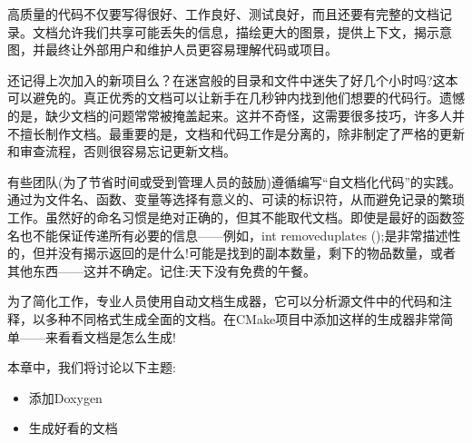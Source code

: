 高质量的代码不仅要写得很好、工作良好、测试良好，而且还要有完整的文档记录。文档允许我们共享可能丢失的信息，描绘更大的图景，提供上下文，揭示意图，并最终让外部用户和维护人员更容易理解代码或项目。

还记得上次加入的新项目么？在迷宫般的目录和文件中迷失了好几个小时吗?这本可以避免的。真正优秀的文档可以让新手在几秒钟内找到他们想要的代码行。遗憾的是，缺少文档的问题常常被掩盖起来。这并不奇怪，这需要很多技巧，许多人并不擅长制作文档。最重要的是，文档和代码工作是分离的，除非制定了严格的更新和审查流程，否则很容易忘记更新文档。

有些团队(为了节省时间或受到管理人员的鼓励)遵循编写“自文档化代码”的实践。通过为文件名、函数、变量等选择有意义的、可读的标识符，从而避免记录的繁琐工作。虽然好的命名习惯是绝对正确的，但其不能取代文档。即使是最好的函数签名也不能保证传递所有必要的信息——例如，int removeduplates ();是非常描述性的，但并没有揭示返回的是什么!可能是找到的副本数量，剩下的物品数量，或者其他东西——这并不确定。记住:天下没有免费的午餐。

为了简化工作，专业人员使用自动文档生成器，它可以分析源文件中的代码和注释，以多种不同格式生成全面的文档。在CMake项目中添加这样的生成器非常简单——来看看文档是怎么生成!

本章中，我们将讨论以下主题:

\begin{itemize}
\item 
添加Doxygen

\item 
生成好看的文档
\end{itemize}
